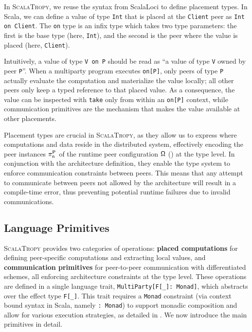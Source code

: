 \documentclass[runningheads]{llncs}
\newcommand{\ourLang}{\textsc{ScalaTropy}}
\newcommand{\code}[1]{\lstinline[style=scala3,basicstyle=\ttfamily\small\color{vscLightText}]{#1}}
\newcommand{\diff}[1]{{#1}}
\begin{document}
In \ourLang{},
we reuse the syntax from ScalaLoci to define placement types.
%
In Scala,
we can define a value of type \code{Int} that is placed at the \code{Client} peer as \code{Int on Client}.
%
The \code{on} type is an infix type which takes two type parameters:
the first is the base type (here, \code{Int}),
and the second is the peer where the value is placed (here, \code{Client}).

\diff{
Intuitively,
a value of type \code{V on P} should be read as ``a value of type \code{V} owned by peer \code{P}''.
%
When a multiparty program executes \code{on[P]},
only peers of type \code{P} actually evaluate the computation and materialize the value locally;
all other peers only keep a typed reference to that placed value.
%
As a consequence,
the value can be inspected with \code{take} only from within an \code{on[P]} context,
while communication primitives are the mechanism that makes the value available at other placements.}

Placement types are crucial in \ourLang{},
as they allow us to express where computations and data reside in the distributed system,
effectively encoding the peer instances $\mathsf{\pi_{n}^{\mathsf{P}_{}}}$ of the runtime peer configuration $\mathsf{\Omega}$ () at the type level.
In conjunction with the architecture definition,
they enable the type system to enforce communication constraints between peers.
%
This means that any attempt to communicate between peers not allowed by the architecture will result in a compile-time error,
thus preventing potential runtime failures due to invalid communications.

\subsection{Language Primitives}\label{sec:language-primitives}
\ourLang{} provides two categories of operations:
\textbf{placed computations} for defining peer-specific computations and extracting local values,
and \textbf{communication primitives} for peer-to-peer communication with differentiated schemes,
all enforcing architecture constraints at the type level.
These operations are defined in a single language trait, \code{MultiParty[F[_]: Monad]}, which abstracts over the effect type \code{F[_]}.
\diff{This trait requires a \code{Monad} constraint (via context bound syntax in Scala, namely \code{: Monad}) to support monadic composition and allow for various execution strategies, as detailed in \Cref{sec:implementation}.}
We now introduce the main primitives in detail.
\end{document}
